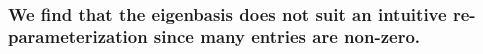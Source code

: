 \documentclass{article}
\begin{document}
    \begin{center}
    \end{center}
    { \hspace*{\fill} \\}
    

    \subsubsection{We find that the eigenbasis does not suit an intuitive
re-parameterization since many entries are non-zero.}



    
    
    
    
\end{document}
